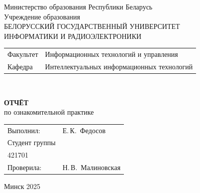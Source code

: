 \begin{titlepage}
  \begin{center}
    Министерство образования Республики Беларусь\\[1em]
    Учреждение образования\\
    БЕЛОРУССКИЙ ГОСУДАРСТВЕННЫЙ УНИВЕРСИТЕТ \\
    ИНФОРМАТИКИ И РАДИОЭЛЕКТРОНИКИ\\[1em]

    \begin{minipage}{\textwidth}
      \begin{flushleft}
        \begin{tabular}{ l l }
          Факультет & Информационных технологий и управления\\
          Кафедра   & Интеллектуальных информационных технологий
        \end{tabular}
      \end{flushleft}
    \end{minipage}\\[1em]

    \vspace{5em}


    \textbf{ОТЧЁТ}\\
    
    {по ознакомительной практике}\\
    \vspace{10em}
    
    \begin{tabular}{ p{}p{} }
      Выполнил:& Е.\,К.~Федосов \\[1em]
      Студент группы& \\
      421701 & \\
      Проверила: & Н.\,В.~Малиновская \\
     
    \end{tabular}
    
    \vfill
    {\normalsize Минск 2025}
  \end{center}
\end{titlepage}
